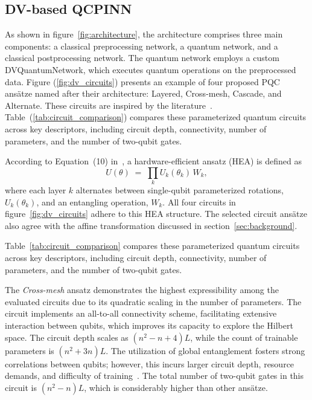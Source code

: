 \subsection{DV-based QCPINN}

As shown in figure~\ref{fig:architecture}, the architecture comprises three main components: a classical preprocessing network, a quantum network, and a classical postprocessing network. The quantum network employs a custom DVQuantumNetwork, which executes quantum operations on the preprocessed data. Figure (\ref{fig:dv_circuits}) presents an example of four proposed PQC ansätze named after their architecture: Layered, Cross-mesh, Cascade, and Alternate. These circuits are inspired by the literature~\cite{farhi2018classification,sim2019expressibility,jaderberg2020minimum,setty2023physics}. Table~(\ref{tab:circuit_comparison}) compares these parameterized quantum circuits across key descriptors, including circuit depth, connectivity, number of parameters, and the number of two-qubit gates. 


According to Equation~(10) in~\cite{mouton2024deep}, a hardware-efficient ansatz (HEA) is defined as
\begin{equation}
\label{eq:HEA}
U(\theta) \;=\; \prod_{k} U_k(\theta_k) \, W_k,
\end{equation}
where each layer $k$ alternates between single-qubit parameterized rotations, $U_k(\theta_k)$, and an entangling operation, $W_k$. All four circuits in figure~\ref{fig:dv_circuits} adhere to this HEA structure. The selected circuit ansätze also agree with the affine transformation discussed in section~\ref{sec:background}.

Table~\ref{tab:circuit_comparison} compares these parameterized quantum circuits across key descriptors, including circuit depth, connectivity, number of parameters, and the number of two-qubit gates.

The \textit{Cross-mesh} ansatz demonstrates the highest expressibility among the evaluated circuits due to its quadratic scaling in the number of parameters. The circuit implements an all-to-all connectivity scheme, facilitating extensive interaction between qubits, which improves its capacity to explore the Hilbert space. The circuit depth scales as $(n^2 - n + 4)L$, while the count of trainable parameters is $(n^2 + 3n)L$. The utilization of global entanglement fosters strong correlations between qubits; however, this incurs larger circuit depth, resource demands, and difficulty of training~\cite{holmes2022connecting}. The total number of two-qubit gates in this circuit is $(n^2 - n)L$, which is considerably higher than other ansätze.

